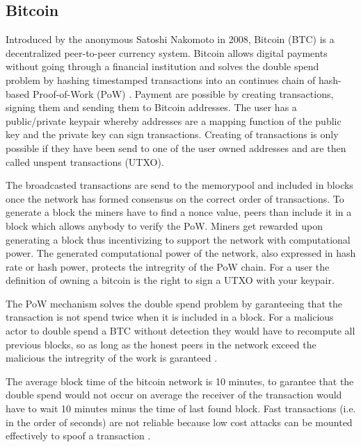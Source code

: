 \subsection{Bitcoin}

Introduced by the anonymous Satoshi Nakomoto in 2008, Bitcoin (BTC) is a decentralized peer-to-peer currency system. Bitcoin allows digital payments without going through a financial institution and solves the double spend problem by hashing timestamped transactions into an continues chain of hash-based Proof-of-Work (PoW) \cite{nakamoto2008bitcoin}. Payment are possible by creating transactions, signing them and sending them to Bitcoin addresses. The user has a public/private keypair whereby addresses are a mapping function of the public key and the private key can sign transactions. Creating of transactions is only possible if they have been send to one of the user owned addresses and are then called unspent transactions (UTXO).\par
The broadcasted transactions are send to the memorypool and included in blocks once the network has formed consensus on the correct order of transactions. To generate a block the miners  have to find a nonce value, peers than include it in a block which allows anybody to verify the PoW. Miners get rewarded upon generating a block thus incentivizing to support the network with computational power. The generated computational power of the network, also expressed in hash rate or hash power, protects the intregrity of the PoW chain. For a user the definition of owning a bitcoin is the right to sign a UTXO with your keypair.\par
The PoW mechanism solves the double spend problem by garanteeing that the transaction is not spend twice when it is included in a block. For a malicious actor to double spend a BTC without detection they would have to recompute all previous blocks, so as long as the honest peers in the network exceed the malicious the intregrity of the work is garanteed \cite{nakamoto2008bitcoin}. \par
The average block time of the bitcoin network is 10 minutes, to garantee that the double spend would not occur on average the receiver of the transaction would have to wait 10 minutes minus the time of last found block. Fast transactions (i.e. in the order of seconds) are not reliable because low cost attacks can be mounted effectively to spoof a transaction \cite{karame2012two}.


